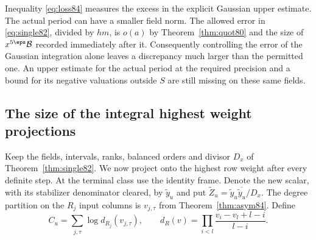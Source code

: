 \documentclass[a4paper,11pt]{article}
\theoremstyle{definition}
\theoremstyle{remark}
\numberwithin{equation}{section}
\begin{document}
Inequality \eqref{eq:loss84} measures the excess in the explicit
Gaussian upper estimate. The actual period can have a smaller
field norm. The allowed error in \eqref{eq:single82}, divided
by \(hm\), is \(o(a)\) by Theorem~\ref{thm:quot80} and the
size of \(x^{5\eps}\mathcal B\) recorded immediately after it.
Consequently controlling the error of the Gaussian integration
alone leaves a discrepancy much larger than the permitted one.
An upper estimate for the actual period at the required precision
and a bound for its negative valuations outside \(S\) are still
missing on these same fields.

\subsection{The size of the integral highest weight projections}\label{nav:VI-20}
Keep the fields, intervals, ranks, balanced orders and divisor
\(D_x\) of Theorem~\ref{thm:single82}. We now project onto the
highest row weight after every definite step. At the terminal
class use the identity frame. Denote the new scalar, with its
stabilizer denominator cleared, by \(\widetilde y_u\) and put
\(\widetilde Z_u=\widetilde y_u\overline{\widetilde y_u}/D_x\).
The degree partition on the \(R_j\) input columns is \(v_{j,\tau}\)
from Theorem~\ref{thm:asym84}. Define
\[
     C_u=\sum_{j,\tau}\log d_{R_j}(v_{j,\tau}),\qquad
     d_R(v)=\prod_{i<l}\frac{v_i-v_l+l-i}{l-i}.
\]
\end{document}
